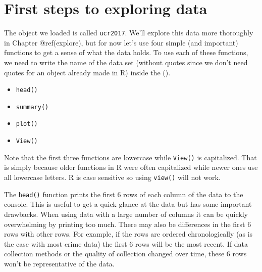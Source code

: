 \documentclass[
  a4paper,
]{krantz}
\providecommand{\tightlist}{%
  \setlength{\itemsep}{0pt}\setlength{\parskip}{0pt}}
\begin{document}
\hypertarget{first-steps-to-exploring-data}{%
\section{First steps to exploring
data}\label{first-steps-to-exploring-data}}

The object we loaded is called \texttt{ucr2017}. We'll
explore this data more thoroughly in Chapter @ref(explore),
but for now let's use four simple (and important) functions
to get a sense of what the data holds. To use each of these
functions, we need to write the name of the data set
(without quotes since we don't need quotes for an object
already made in R) inside the ().

\begin{itemize}
\tightlist
\item
  \texttt{head()}
\item
  \texttt{summary()}
\item
  \texttt{plot()}
\item
  \texttt{View()}
\end{itemize}

Note that the first three functions are lowercase while
\texttt{View()} is capitalized. That is simply because older
functions in R were often capitalized while newer ones use
all lowercase letters. R is case sensitive so using
\texttt{view()} will not work.

The \texttt{head()} function prints the first 6 rows of each
column of the data to the console. This is useful to get a
quick glance at the data but has some important drawbacks.
When using data with a large number of columns it can be
quickly overwhelming by printing too much. There may also be
differences in the first 6 rows with other rows. For
example, if the rows are ordered chronologically (as is the
case with most crime data) the first 6 rows will be the most
recent. If data collection methods or the quality of
collection changed over time, these 6 rows won't be
representative of the data.
\end{document}
